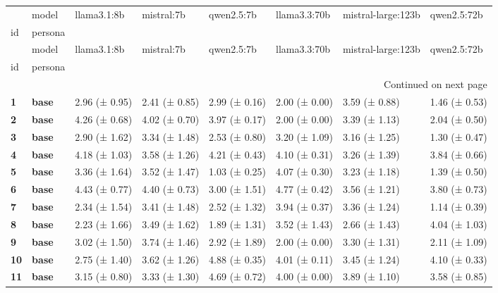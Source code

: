 \begin{longtable}{llllllll}
\toprule
 & model & llama3.1:8b & mistral:7b & qwen2.5:7b & llama3.3:70b & mistral-large:123b & qwen2.5:72b \\
id & persona &  &  &  &  &  &  \\
\midrule
\endfirsthead
\toprule
 & model & llama3.1:8b & mistral:7b & qwen2.5:7b & llama3.3:70b & mistral-large:123b & qwen2.5:72b \\
id & persona &  &  &  &  &  &  \\
\midrule
\endhead
\midrule
\multicolumn{8}{r}{Continued on next page} \\
\midrule
\endfoot
\bottomrule
\endlastfoot
\textbf{1} & \textbf{base} & 2.96 (± 0.95) & 2.41 (± 0.85) & 2.99 (± 0.16) & 2.00 (± 0.00) & 3.59 (± 0.88) & 1.46 (± 0.53) \\
\cline{1-8}
\textbf{2} & \textbf{base} & 4.26 (± 0.68) & 4.02 (± 0.70) & 3.97 (± 0.17) & 2.00 (± 0.00) & 3.39 (± 1.13) & 2.04 (± 0.50) \\
\cline{1-8}
\textbf{3} & \textbf{base} & 2.90 (± 1.62) & 3.34 (± 1.48) & 2.53 (± 0.80) & 3.20 (± 1.09) & 3.16 (± 1.25) & 1.30 (± 0.47) \\
\cline{1-8}
\textbf{4} & \textbf{base} & 4.18 (± 1.03) & 3.58 (± 1.26) & 4.21 (± 0.43) & 4.10 (± 0.31) & 3.26 (± 1.39) & 3.84 (± 0.66) \\
\cline{1-8}
\textbf{5} & \textbf{base} & 3.36 (± 1.64) & 3.52 (± 1.47) & 1.03 (± 0.25) & 4.07 (± 0.30) & 3.23 (± 1.18) & 1.39 (± 0.50) \\
\cline{1-8}
\textbf{6} & \textbf{base} & 4.43 (± 0.77) & 4.40 (± 0.73) & 3.00 (± 1.51) & 4.77 (± 0.42) & 3.56 (± 1.21) & 3.80 (± 0.73) \\
\cline{1-8}
\textbf{7} & \textbf{base} & 2.34 (± 1.54) & 3.41 (± 1.48) & 2.52 (± 1.32) & 3.94 (± 0.37) & 3.36 (± 1.24) & 1.14 (± 0.39) \\
\cline{1-8}
\textbf{8} & \textbf{base} & 2.23 (± 1.66) & 3.49 (± 1.62) & 1.89 (± 1.31) & 3.52 (± 1.43) & 2.66 (± 1.43) & 4.04 (± 1.03) \\
\cline{1-8}
\textbf{9} & \textbf{base} & 3.02 (± 1.50) & 3.74 (± 1.46) & 2.92 (± 1.89) & 2.00 (± 0.00) & 3.30 (± 1.31) & 2.11 (± 1.09) \\
\cline{1-8}
\textbf{10} & \textbf{base} & 2.75 (± 1.40) & 3.62 (± 1.26) & 4.88 (± 0.35) & 4.01 (± 0.11) & 3.45 (± 1.24) & 4.10 (± 0.33) \\
\cline{1-8}
\textbf{11} & \textbf{base} & 3.15 (± 0.80) & 3.33 (± 1.30) & 4.69 (± 0.72) & 4.00 (± 0.00) & 3.89 (± 1.10) & 3.58 (± 0.85) \\

\end{longtable}
